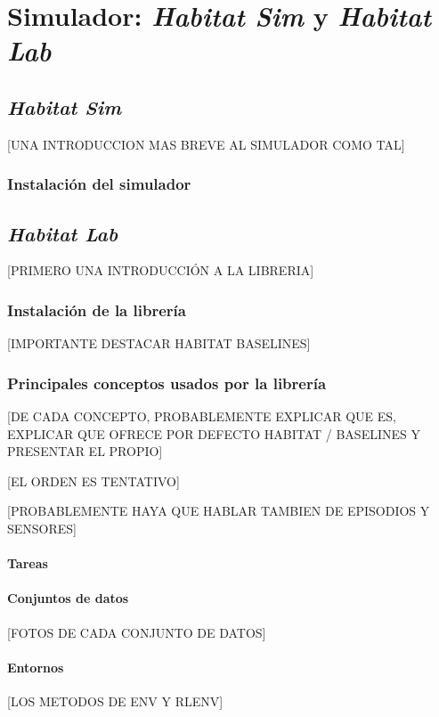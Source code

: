 \chapter{Simulador: \textit{Habitat Sim} y \textit{Habitat Lab}}

\section{\textit{Habitat Sim}}
[UNA INTRODUCCION MAS BREVE AL SIMULADOR COMO TAL]

\subsection{Instalación del simulador}

\section{\textit{Habitat Lab}}
[PRIMERO UNA INTRODUCCIÓN A LA LIBRERIA]

\subsection{Instalación de la librería}
[IMPORTANTE DESTACAR HABITAT BASELINES]

\subsection{Principales conceptos usados por la librería}
[DE CADA CONCEPTO, PROBABLEMENTE EXPLICAR QUE ES, EXPLICAR QUE OFRECE POR DEFECTO HABITAT / BASELINES Y PRESENTAR EL PROPIO]

[EL ORDEN ES TENTATIVO]

[PROBABLEMENTE HAYA QUE HABLAR TAMBIEN DE EPISODIOS Y SENSORES]

\subsubsection{Tareas}

\subsubsection{Conjuntos de datos}
[FOTOS DE CADA CONJUNTO DE DATOS]

\subsubsection{Entornos}
[LOS METODOS DE ENV Y RLENV]

